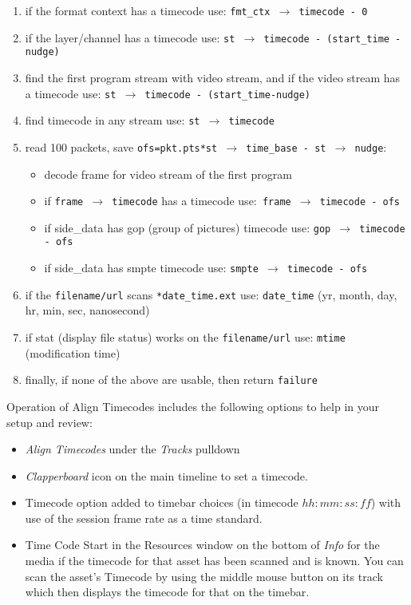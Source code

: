 \begin{enumerate}
	\item if the format context has a timecode use: \texttt{fmt\_ctx $\rightarrow$ timecode - 0}
	\item if the layer/channel has a timecode use: \texttt{st $\rightarrow$ timecode - (start\_time -nudge)}
	\item find the first program stream with video stream, and if the video stream has a timecode use:
	\texttt{st $\rightarrow$ timecode - (start\_time-nudge)}
	\item find timecode in any stream use: \texttt{st $\rightarrow$ timecode}
	\item read 100 packets, save \texttt{ofs=pkt.pts*st $\rightarrow$ time\_base - st $\rightarrow$ nudge}:
	\begin{itemize}
		\item decode frame for video stream of the first program
		\item if \texttt{frame $\rightarrow$ timecode} has a timecode use:\texttt{ frame $\rightarrow$ timecode - ofs}
		\item if side\_data has gop (group of pictures) timecode use: \texttt{gop $\rightarrow$ timecode - ofs}
		\item if side\_data has smpte timecode use: \texttt{smpte $\rightarrow$ timecode - ofs}
	\end{itemize}
	\item if the \texttt{filename/url} scans \texttt{*date\_time.ext} use: \texttt{date\_time} (yr, month, day, hr, min, sec, nanosecond)
	\item if stat (display file status) works on the \texttt{filename/url} use: \texttt{mtime} (modification time)
	\item finally, if none of the above are usable, then return \texttt{failure}
\end{enumerate}

Operation of Align Timecodes includes the following options to help in your setup and review:

\begin{itemize}
	\item \textit{Align Timecodes} under the \textit{Tracks} pulldown
	\item \textit{Clapperboard} icon on the main timeline to set a timecode.
	\item Timecode option added to timebar choices (in timecode $hh:mm:ss:ff$) with use of the session frame
	rate as a time standard.
	\item Time Code Start in the Resources window on the bottom of \textit{Info} for the media if the timecode for that
	asset has been scanned and is known. You can scan the asset’s Timecode by using the middle mouse
	button on its track which then displays the timecode for that on the timebar.
\end{itemize}

